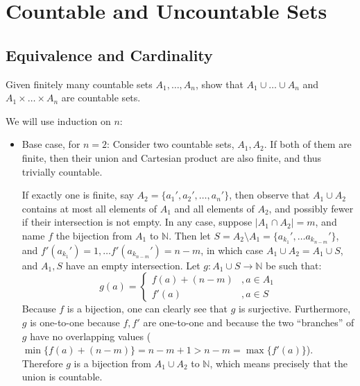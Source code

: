 \chapter{Countable and Uncountable Sets}

\section{Equivalence and Cardinality}

\begin{exercise}{3}
    Given finitely many countable sets $A_1, \ldots, A_n$, show that $A_1 \cup \ldots \cup A_n$ and $A_1 \times \ldots \times A_n$ are countable sets.
\end{exercise}

\begin{solution}

    We will use induction on $n$:
    \begin{itemize}
        \item Base case, for $n = 2$: Consider two countable sets, $A_1, A_2$. If both of them are finite, then their union and Cartesian product are also finite, and thus trivially countable.
        
        If exactly one is finite, say $A_2 = \{a_1', a_2', \ldots, a_n'\}$, then observe that $A_1 \cup A_2$ contains at most all elements of $A_1$ and all elements of $A_2$, and possibly fewer if their intersection is not empty.
        In any case, suppose $\lvert A_1 \cap A_2 \rvert = m$, and name $f$ the bijection from $A_1$ to $\mathbb{N}$.
        Then let $S = A_2 \setminus A_1 = \{a_{k_1}', \ldots a_{k_{n-m}}'\}$, and $f'(a_{k_1}') = 1, \ldots f'(a_{k_{n-m}}') = n - m$, in which case $A_1 \cup A_2 = A_1 \cup S$, and $A_1, S$ have an empty intersection.
        Let $g: A_1 \cup S \rightarrow \mathbb{N}$ be such that:
        $$g(a) = \begin{cases} 
            f(a) + (n - m) &, a \in A_1 \\
            f'(a) &, a \in S
            \end{cases}$$
        Because $f$ is a bijection, one can clearly see that $g$ is surjective.
        Furthermore, $g$ is one-to-one because $f, f'$ are one-to-one and because the two ``branches'' of $g$ have no overlapping values ($\min\{f(a) + (n-m)\} = n - m + 1> n - m =\max\{f'(a)\}$).
        Therefore $g$ is a bijection from $A_1 \cup A_2$ to $\mathbb{N}$, which means precisely that the union is countable.


\end{itemize}
\end{solution}
